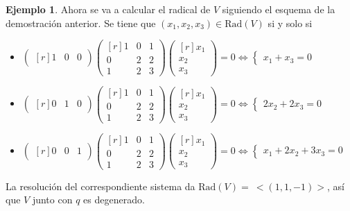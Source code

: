 \documentclass[12pt]{report}
\theoremstyle{definition}
\theoremstyle{definition}
\newtheorem{example}{Ejemplo}[chapter]
\theoremstyle{remark}
\begin{document}
\begin{example}
\vspace{2mm}
\noindent Ahora se va a calcular el radical de $V$ siguiendo el esquema de la demostración anterior. Se tiene que $(x_1,x_2,x_3) \in \textrm{Rad}(V)$ si y solo si
\begin{itemize}
    \item $ \displaystyle
\begin{pmatrix*}[r]
    1 & 0 & 0
\end{pmatrix*}\begin{pmatrix*}[r]
    1 & 0 & 1 \\
    0 & 2 & 2 \\
    1 & 2 & 3
\end{pmatrix*}\begin{pmatrix*}[r]
    x_1 \\
    x_2 \\
    x_3
\end{pmatrix*} = 0 \iff \begin{cases}
    x_1+x_3=0
\end{cases}
$
    \item $ \displaystyle
\begin{pmatrix*}[r]
    0 & 1 & 0
\end{pmatrix*}\begin{pmatrix*}[r]
    1 & 0 & 1 \\
    0 & 2 & 2 \\
    1 & 2 & 3
\end{pmatrix*}\begin{pmatrix*}[r]
    x_1 \\
    x_2 \\
    x_3
\end{pmatrix*} = 0 \iff \begin{cases}
    2x_2+2x_3=0
\end{cases}
$
    \item $ \displaystyle
\begin{pmatrix*}[r]
    0 & 0 & 1
\end{pmatrix*}\begin{pmatrix*}[r]
    1 & 0 & 1 \\
    0 & 2 & 2 \\
    1 & 2 & 3
\end{pmatrix*}\begin{pmatrix*}[r]
    x_1 \\
    x_2 \\
    x_3
\end{pmatrix*} = 0 \iff \begin{cases}
    x_1+2x_2+3x_3=0
\end{cases}
$
\end{itemize}
La resolución del correspondiente sistema da $\textrm{Rad}(V) = \ < (1,1,-1)>$, así que $V$ junto con $q$ es degenerado.


\end{example}
\end{document}
